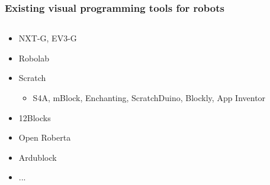 \documentclass[xetex,mathserif,serif]{beamer}
\begin{document}
	\begin{frame}
		\frametitle{Existing visual programming tools for robots}
		\begin{columns}
			\begin{column}{0.6\textwidth}
				\begin{itemize}
					\item NXT-G, EV3-G
					\item Robolab
					\item Scratch
					\begin{itemize}
						\item S4A, mBlock, Enchanting, ScratchDuino, Blockly, App Inventor
					\end{itemize}
					\item 12Blocks
					\item Open Roberta
					\item Ardublock
					\item ...
				\end{itemize}
			\end{column}
			\begin{column}{0.4\textwidth}
			\end{column}
		\end{columns}
	\end{frame}
\end{document}
